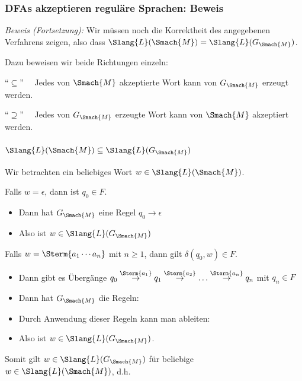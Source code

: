 \documentclass[aspectratio=1610,onlymath]{beamer}
\begin{document}
\begin{frame}\frametitle{DFAs akzeptieren reguläre Sprachen: Beweis}

\bigskip


\emph{Beweis (Fortsetzung):} Wir müssen noch die Korrektheit des angegebenen Verfahrens zeigen, also dass $\Slang{L}(\Smach{M})=\Slang{L}(G_{\Smach{M}})$.
\medskip

Dazu beweisen wir beide Richtungen einzeln:
\bigskip

\alert{"`$\subseteq$"'}~~ Jedes von $\Smach{M}$ akzeptierte Wort kann von $G_{\Smach{M}}$ erzeugt werden.
\bigskip

\alert{"`$\supseteq$"'}~~ Jedes von $G_{\Smach{M}}$ erzeugte Wort kann von $\Smach{M}$ akzeptiert werden.

\end{frame}

\begin{frame}\frametitle{$\Slang{L}(\Smach{M})\subseteq\Slang{L}(G_{\Smach{M}})$}

Wir betrachten ein beliebiges Wort $w\in\Slang{L}(\Smach{M})$.\pause
\medskip

Falls $w=\epsilon$, dann ist $q_0\in F$.\pause
\begin{itemize}
\item Dann hat $G_{\Smach{M}}$ eine Regel $q_0\to\epsilon$
\item Also ist $w\in\Slang{L}(G_{\Smach{M}})$\pause
\end{itemize}
\medskip

Falls $w=\Sterm{a_1\cdots a_n}$ mit $n\geq 1$, dann gilt $\delta(q_0,w)\in F$.\pause
\begin{itemize}
\item Dann gibt es Übergänge $q_0 \stackrel{\Sterm{a_1}}{\to} q_1 \stackrel{\Sterm{a_2}}{\to} \ldots \stackrel{\Sterm{a_n}}{\to} q_n$ mit $q_n\in F$\pause
\item Dann hat $G_{\Smach{M}}$ die Regeln: \\[1ex]
	\pause
\item Durch Anwendung dieser Regeln kann man ableiten:\\[1ex]
	\pause
\item Also ist $w\in\Slang{L}(G_{\Smach{M}})$.
\end{itemize}

Somit gilt $w\in\Slang{L}(G_{\Smach{M}})$ für beliebige $w\in\Slang{L}(\Smach{M})$, d.h.

\end{frame}
\end{document}
